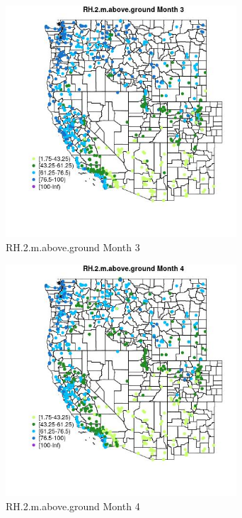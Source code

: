 \begin{figure} 
\centering  
\includegraphics[width=0.77\textwidth]{Code_Outputs/Report_ML_input_PM25_Step4_part_f_de_duplicated_aves_prioritize_24hr_obswNAs_MapObsMo3RH2maboveground.jpg} 
\caption{\label{fig:Report_ML_input_PM25_Step4_part_f_de_duplicated_aves_prioritize_24hr_obswNAsMapObsMo3RH2maboveground}RH.2.m.above.ground Month 3} 
\end{figure} 
 

\begin{figure} 
\centering  
\includegraphics[width=0.77\textwidth]{Code_Outputs/Report_ML_input_PM25_Step4_part_f_de_duplicated_aves_prioritize_24hr_obswNAs_MapObsMo4RH2maboveground.jpg} 
\caption{\label{fig:Report_ML_input_PM25_Step4_part_f_de_duplicated_aves_prioritize_24hr_obswNAsMapObsMo4RH2maboveground}RH.2.m.above.ground Month 4} 
\end{figure} 
 

